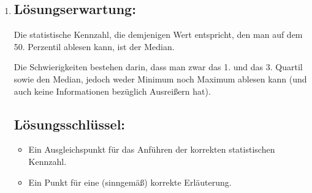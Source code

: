\begin{langesbeispiel}
{\begin{enumerate}
\item \subsection{Lösungserwartung:}

Die statistische Kennzahl, die demjenigen Wert entspricht, den man auf dem 50. Perzentil ablesen kann, ist der Median.

Die Schwierigkeiten bestehen darin, dass man zwar das 1. und das 3. Quartil sowie den Median, jedoch weder Minimum noch Maximum ablesen kann (und auch keine Informationen bezüglich Ausreißern hat).

\subsection{Lösungsschlüssel:}
\begin{itemize}
	\item Ein Ausgleichspunkt für das Anführen der korrekten statistischen Kennzahl.
	\item Ein Punkt für eine (sinngemäß) korrekte Erläuterung.
\end{itemize}
\end{enumerate}}
		\end{langesbeispiel}